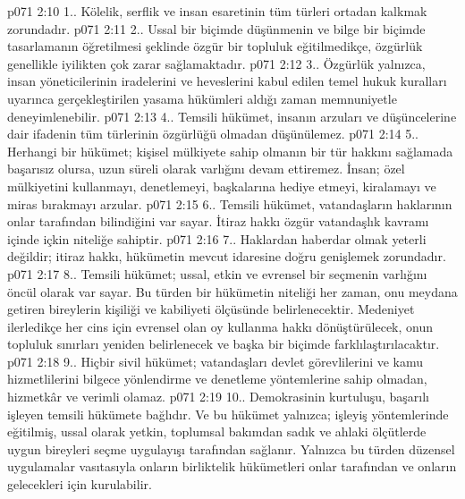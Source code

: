 \vs p071 2:10 1.. Kölelik, serflik ve insan esaretinin tüm türleri ortadan kalkmak zorundadır.
\vs p071 2:11 2.\bibnobreakspace {}. Ussal bir biçimde düşünmenin ve bilge bir biçimde tasarlamanın öğretilmesi şeklinde özgür bir topluluk eğitilmedikçe, özgürlük genellikle iyilikten çok zarar sağlamaktadır.
\vs p071 2:12 3.. Özgürlük yalnızca, insan yöneticilerinin iradelerini ve heveslerini kabul edilen temel hukuk kuralları uyarınca gerçekleştirilen yasama hükümleri aldığı zaman memnuniyetle deneyimlenebilir.
\vs p071 2:13 4.. Temsili hükümet, insanın arzuları ve düşüncelerine dair ifadenin tüm türlerinin özgürlüğü olmadan düşünülemez.
\vs p071 2:14 5.. Herhangi bir hükümet; kişisel mülkiyete sahip olmanın bir tür hakkını sağlamada başarısız olursa, uzun süreli olarak varlığını devam ettiremez. İnsan; özel mülkiyetini kullanmayı, denetlemeyi, başkalarına hediye etmeyi, kiralamayı ve miras bırakmayı arzular.
\vs p071 2:15 6.. Temsili hükümet, vatandaşların haklarının onlar tarafından bilindiğini var sayar. İtiraz hakkı özgür vatandaşlık kavramı içinde içkin niteliğe sahiptir.
\vs p071 2:16 7.\bibnobreakspace {}. Haklardan haberdar olmak yeterli değildir; itiraz hakkı, hükümetin mevcut idaresine doğru genişlemek zorundadır.
\vs p071 2:17 8.\bibnobreakspace {}. Temsili hükümet; ussal, etkin ve evrensel bir seçmenin varlığını öncül olarak var sayar. Bu türden bir hükümetin niteliği her zaman, onu meydana getiren bireylerin kişiliği ve kabiliyeti ölçüsünde belirlenecektir. Medeniyet ilerledikçe her cins için evrensel olan oy kullanma hakkı dönüştürülecek, onun topluluk sınırları yeniden belirlenecek ve başka bir biçimde farklılaştırılacaktır.
\vs p071 2:18 9.\bibnobreakspace {}. Hiçbir sivil hükümet; vatandaşları devlet görevlilerini ve kamu hizmetlilerini bilgece yönlendirme ve denetleme yöntemlerine sahip olmadan, hizmetkâr ve verimli olamaz.
\vs p071 2:19 10.\bibnobreakspace {}. Demokrasinin kurtuluşu, başarılı işleyen temsili hükümete bağlıdır. Ve bu hükümet yalnızca; işleyiş yöntemlerinde eğitilmiş, ussal olarak yetkin, toplumsal bakımdan sadık ve ahlaki ölçütlerde uygun bireyleri seçme uygulayışı tarafından sağlanır. Yalnızca bu türden düzensel uygulamalar vasıtasıyla onların birliktelik hükümetleri onlar tarafından ve onların gelecekleri için kurulabilir.
